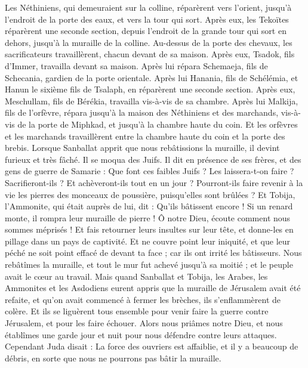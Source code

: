\begin{multicols}{2}
Les Néthiniens, qui demeuraient sur la colline, réparèrent vers l'orient, jusqu'à l'endroit de la porte des eaux, et vers la tour qui sort.
Après eux, les Tekoïtes réparèrent une seconde section, depuis l'endroit de la grande tour qui sort en dehors, jusqu'à la muraille de la colline.
Au-dessus de la porte des chevaux, les sacrificateurs travaillèrent, chacun devant de sa maison.
Après eux, Tsadok, fils d'Immer, travailla devant sa maison. Après lui répara Schemaeja, fils de Schecania, gardien de la porte orientale.
Après lui Hanania, fils de Schélémia, et Hanun le sixième fils de Tsalaph, en réparèrent une seconde section. Après eux, Meschullam, fils de Bérékia, travailla vis-à-vis de sa chambre.
Après lui Malkija, fils de l'orfèvre, répara jusqu'à la maison des Néthiniens et des marchands, vis-à-vis de la porte de Miphkad, et jusqu'à la chambre haute du coin.
Et les orfèvres et les marchands travaillèrent entre la chambre haute du coin et la porte des brebis.
\VerseOne{}Lorsque Sanballat apprit que nous rebâtissions la muraille, il devint furieux et très fâché. Il se moqua des Juifs.
Il dit en présence de ses frères, et des gens de guerre de Samarie : Que font ces faibles Juifs ? Les laissera-t-on faire ? Sacrifieront-ils ? Et achèveront-ils tout en un jour ? Pourront-ils faire revenir à la vie les pierres des monceaux de poussière, puisqu'elles sont brûlées ?
Et Tobija, l'Ammonite, qui était auprès de lui, dit : Qu'ils bâtissent encore ! Si un renard monte, il rompra leur muraille de pierre !
Ô notre Dieu, écoute comment nous sommes méprisés ! Et fais retourner leurs insultes sur leur tête, et donne-les en pillage dans un pays de captivité.
Et ne couvre point leur iniquité, et que leur péché ne soit point effacé de devant ta face ; car ils ont irrité les bâtisseurs.
Nous rebâtîmes la muraille, et tout le mur fut achevé jusqu'à sa moitié ; et le peuple avait le cœur au travail.
Mais quand Sanballat et Tobija, les Arabes, les Ammonites et les Asdodiens eurent appris que la muraille de Jérusalem avait été refaite, et qu'on avait commencé à fermer les brèches, ils s'enflammèrent de colère.
Et ils se liguèrent tous ensemble pour venir faire la guerre contre Jérusalem, et pour les faire échouer.
Alors nous priâmes notre Dieu, et nous établîmes une garde jour et nuit pour nous défendre contre leurs attaques.
Cependant Juda disait : La force des ouvriers est affaiblie, et il y a beaucoup de débris, en sorte que nous ne pourrons pas bâtir la muraille.

\end{multicols}
